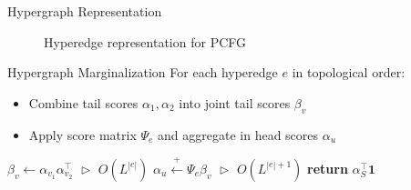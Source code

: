 \documentclass{beamer}
\newlength{\onecolwid}
\begin{document}
\begin{frame}
\begin{columns}[t]
\begin{column}{\onecolwid}
\begin{block}{Hypergraph Representation}
\begin{figure}
\begin{center}
{
}
\end{center}
\caption{Hyperedge representation for PCFG}
\end{figure}
\end{block}

\begin{block}{Hypergraph Marginalization}
For each hyperedge $e$ in topological order:
\vspace{1em}
\begin{itemize}
\item Combine tail scores $\alpha_1,\alpha_2$ into joint tail scores $\beta_v$
\vspace{1em}
\item Apply score matrix $\Psi_e$ and aggregate in head scores $\alpha_u$
\end{itemize}
\vspace{1em}
\centering
\begin{algorithm}[H]
\caption{\label{alg:hypergraph-marg} Hypergraph marginalization / belief prop}
\begin{algorithmic} 
\STATE $\beta_v \gets \alpha_{v_1}\alpha_{v_2}^\top$
    \hfill $\vartriangleright$ $O(L^{|e|})$
\STATE $\alpha_u \stackrel{+}{\gets} \Psi_e\beta_v$
    \hfill $\vartriangleright$ $O(L^{|e|+1})$
\ENDFOR
\STATE \textbf{return} $\alpha_S^\top \mathbf{1}$
\end{algorithmic}

\end{algorithm}
\end{block}



\end{column}
\end{columns}
\end{frame}
\end{document}
